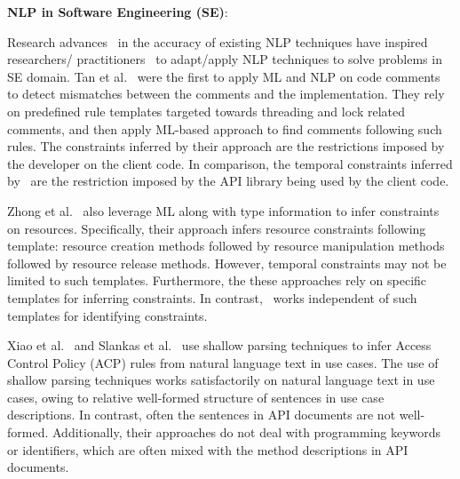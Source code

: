 \textbf{NLP in Software Engineering (SE)}:

Research advances~\cite{Marneffe08COLING,KleinNIPS03} in the accuracy of existing NLP techniques have inspired researchers/ practitioners~\cite{pandita12:inferring, pandita13:WHYPER, johnSlankasPASSAT13, XiaoFSE2012, thummalapentaICSE12} to adapt/apply NLP techniques to solve problems in SE domain. 
Tan et al.~\cite{TanSOSP07} were the first to apply ML and NLP on code comments to detect mismatches between the comments and the implementation.
They rely on predefined rule templates targeted towards threading and lock related comments, and then apply ML-based approach to find comments following such rules.
The constraints inferred by their approach are the restrictions imposed by the developer on the client code.
In comparison, the temporal constraints inferred by \tool\ are the restriction imposed by the API library being used by the client code.

Zhong et al.~\cite{zhong09SE} also leverage ML along with type information to infer constraints on resources.
Specifically, their approach infers resource constraints following template: resource creation methods followed by resource manipulation methods followed by resource release methods.
However, temporal constraints may not be limited to such templates. 
Furthermore, the these approaches rely on specific templates for inferring constraints. In contrast, \tool\ works independent of such templates for identifying constraints.



Xiao et al.~\cite{XiaoFSE2012} and Slankas et al.~\cite{johnSlankasPASSAT13} use shallow parsing techniques to infer Access Control Policy (ACP) rules from natural language text in use cases.
The use of shallow parsing techniques works satisfactorily on natural language text in use cases, owing to relative well-formed structure of sentences in use case descriptions.
In contrast, often the sentences in API documents are not well-formed.
Additionally, their approaches do not deal with programming keywords or identifiers, which are often mixed with the method descriptions in API documents.

